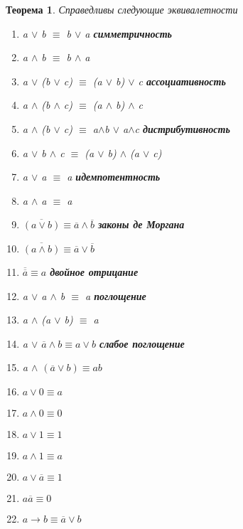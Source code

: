 \documentclass[a4paper]{article}
\newtheorem{theorem}{Теорема}[section]
\theoremstyle{definition}
\theoremstyle{remark}
\begin{document}
	\begin{theorem}
		Справедливы следующие эквивалетности
        \begin{multicols*}{2}
            \begin{enumerate}
                \item a $\vee$ b $\equiv$ b $\vee$ a  \textbf{симметричность}
                \item a $\wedge$ b $\equiv$ b $\wedge$ a
                \item a $\vee$ (b $\vee$ c) $\equiv$ (a $\vee$ b) $\vee$ c \textbf{ассоциативность}
                \item a $\wedge$ (b $\wedge$ c) $\equiv$ (a $\wedge$ b) $\wedge$ c
                \item a $\wedge$ (b $\vee$ c) $\equiv$ a$\wedge$b $\vee$ a$\wedge$c \textbf{дистрибутивность}
                \item a $\vee$  b $\wedge$ c $\equiv$ (a $\vee$ b) $\wedge$ (a $\vee$ c)
                \item a $\vee$ a $\equiv$ a \textbf{идемпотентность}
                \item a $\wedge$ a $\equiv$ a
                \item $\overline{(a \vee b)} \equiv \overline{a} \wedge \overline{b}$ \textbf{законы де Моргана}
                \item $\overline{(a \wedge b)} \equiv \overline{a} \vee \overline{b}$
                \item $\overline{\overline{a}} \equiv a$ \textbf{двойное отрицание}
                \item a $\vee$ a $\wedge$ b $\equiv$ a \textbf{поглощение}
                \item a $\wedge$ (a $\vee$ b) $\equiv$ a
                \item a $\vee$ $\overline{a} \wedge b \equiv a \vee b$ \textbf{слабое поглощение}
                \item a $\wedge$ $(\overline{a} \vee b) \equiv ab$
                \item $a \vee 0 \equiv a$
                \item $a \wedge 0 \equiv 0$
                \item $a \vee 1 \equiv 1$
                \item $a \wedge 1 \equiv a$
                \item $a \vee \overline{a} \equiv 1$
                \item $a\overline{a} \equiv 0$
                \item $a \rightarrow b \equiv \overline{a} \vee b$

\end{enumerate}
\end{multicols*}
\end{theorem}
\end{document}
